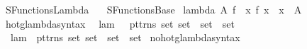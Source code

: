 %
\begin{isabellebody}%
%
%
\isadelimdocument
%
\endisadelimdocument
%
\isatagdocument
%
\isamarkuptrue%
%
\endisatagdocument
{\isafolddocument}%
%
\isadelimdocument
%
\endisadelimdocument
%
\isadelimtheory
%
\endisadelimtheory
%
\isatagtheory
{}\isamarkupfalse%
\ SFunctions{\isacharunderscore}{\kern0pt}Lambda\isanewline
\ \ \ SFunctions{\isacharunderscore}{\kern0pt}Base\isanewline
{}%
\endisatagtheory
{\isafoldtheory}%
%
\isadelimtheory
\isanewline
%
\endisadelimtheory
\isanewline
{}\isamarkupfalse%
\ {\isachardoublequoteopen}lambda\ A\ f\ {\isasymequiv}\ {\isacharbraceleft}{\kern0pt}{\isasymlangle}x{\isacharcomma}{\kern0pt}\ f\ x{\isasymrangle}\ {\isacharbar}{\kern0pt}\ x\ {\isasymin}\ A{\isacharbraceright}{\kern0pt}{\isachardoublequoteclose}\isanewline
\isanewline
{}\isamarkupfalse%
\ hotg{\isacharunderscore}{\kern0pt}lambda{\isacharunderscore}{\kern0pt}syntax\isanewline
{}\isanewline
{}\isamarkupfalse%
\isanewline
\ \ {\isachardoublequoteopen}{\isacharunderscore}{\kern0pt}lam{\isachardoublequoteclose}\ \ {\isacharcolon}{\kern0pt}{\isacharcolon}{\kern0pt}\ {\isachardoublequoteopen}{\isacharbrackleft}{\kern0pt}pttrns{\isacharcomma}{\kern0pt}\ set{\isacharcomma}{\kern0pt}\ set\ {\isasymRightarrow}\ set{\isacharbrackright}{\kern0pt}\ {\isasymRightarrow}\ set{\isachardoublequoteclose}\ {\isacharparenleft}{\kern0pt}{\isachardoublequoteopen}{\isacharparenleft}{\kern0pt}{}{\isasymlambda}{\isacharunderscore}{\kern0pt}\ {\isasymin}\ {\isacharunderscore}{\kern0pt}{\isachardot}{\kern0pt}{\isacharslash}{\kern0pt}\ {\isacharunderscore}{\kern0pt}{\isacharparenright}{\kern0pt}{\isachardoublequoteclose}\ {}{}{\isacharparenright}{\kern0pt}\isanewline
\ \ {\isachardoublequoteopen}{\isacharunderscore}{\kern0pt}lam{}{\isachardoublequoteclose}\ {\isacharcolon}{\kern0pt}{\isacharcolon}{\kern0pt}\ {\isachardoublequoteopen}{\isacharbrackleft}{\kern0pt}pttrns{\isacharcomma}{\kern0pt}\ set{\isacharcomma}{\kern0pt}\ set\ {\isasymRightarrow}\ set{\isacharbrackright}{\kern0pt}\ {\isasymRightarrow}\ set{\isachardoublequoteclose}\isanewline
{}\isamarkupfalse%
\isanewline
{}\isamarkupfalse%
\ no{\isacharunderscore}{\kern0pt}hotg{\isacharunderscore}{\kern0pt}lambda{\isacharunderscore}{\kern0pt}syntax\isanewline
{}\isanewline

\end{isabellebody}
